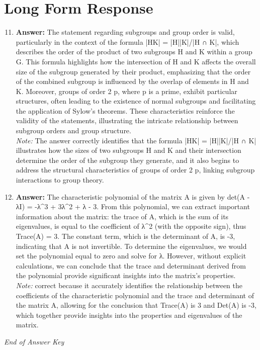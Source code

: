 \documentclass[12pt]{article}
\begin{document}
\section*{Long Form Response}
\begin{enumerate}[label=\arabic*.]
\setcounter{enumi}{10}
\item \textbf{Answer:} The statement regarding subgroups and group order is valid, particularly in the context of the formula |HK| = |H||K|/|H ∩ K|, which describes the order of the product of two subgroups H and K within a group G. This formula highlights how the intersection of H and K affects the overall size of the subgroup generated by their product, emphasizing that the order of the combined subgroup is influenced by the overlap of elements in H and K. Moreover, groups of order 2 p, where p is a prime, exhibit particular structures, often leading to the existence of normal subgroups and facilitating the application of Sylow's theorems. These characteristics reinforce the validity of the statements, illustrating the intricate relationship between subgroup orders and group structure.
\\ \textit{Note:} The answer correctly identifies that the formula |HK| = |H||K|/|H ∩ K| illustrates how the sizes of two subgroups H and K and their intersection determine the order of the subgroup they generate, and it also begins to address the structural characteristics of groups of order 2 p, linking subgroup interactions to group theory.
\item \textbf{Answer:} The characteristic polynomial of the matrix A is given by det(A - λI) = -λ^3 + 3λ^2 + λ - 3. From this polynomial, we can extract important information about the matrix: the trace of A, which is the sum of its eigenvalues, is equal to the coefficient of λ^2 (with the opposite sign), thus Trace(A) = 3. The constant term, which is the determinant of A, is -3, indicating that A is not invertible. To determine the eigenvalues, we would set the polynomial equal to zero and solve for λ. However, without explicit calculations, we can conclude that the trace and determinant derived from the polynomial provide significant insights into the matrix's properties.
\\ \textit{Note:} correct because it accurately identifies the relationship between the coefficients of the characteristic polynomial and the trace and determinant of the matrix A, allowing for the conclusion that Trace(A) is 3 and Det(A) is -3, which together provide insights into the properties and eigenvalues of the matrix.
\end{enumerate}

\vfill
\noindent\textit{End of Answer Key}
\end{document}
